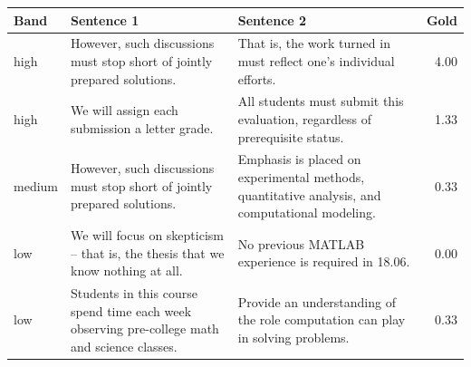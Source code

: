 \setlength{\tabcolsep}{4pt}
\begin{tabularx}{\textwidth}{@{}l>{\raggedright\arraybackslash}X>{\raggedright\arraybackslash}Xr@{}}
\toprule
Band & Sentence 1 & Sentence 2 & Gold \\
\midrule
high & However, such discussions must stop short of jointly prepared solutions. & That is, the work turned in must reflect one's individual efforts. & 4.00 \\
high & We will assign each submission a letter grade. & All students must submit this evaluation, regardless of prerequisite status. & 1.33 \\
medium & However, such discussions must stop short of jointly prepared solutions. & Emphasis is placed on experimental methods, quantitative analysis, and computational modeling. & 0.33 \\
low & We will focus on skepticism -- that is, the thesis that we know nothing at all. & No previous MATLAB experience is required in 18.06. & 0.00 \\
low & Students in this course spend time each week observing pre-college math and science classes. & Provide an understanding of the role computation can play in solving problems. & 0.33 \\
\bottomrule
\end{tabularx}
